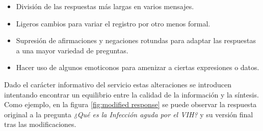 \begin{itemize}
	\item División de las respuestas más largas en varios mensajes.
	\item Ligeros cambios para variar el registro por otro menos formal.
	\item Supresión de afirmaciones y negaciones rotundas para adaptar las respuestas a una mayor variedad de preguntas.
	\item Hacer uso de algunos emoticonos para amenizar a ciertas expresiones o datos.
\end{itemize}

Dado el carácter informativo del servicio estas alteraciones se introducen intentando encontrar un equilibrio entre la calidad de la información y la síntesis. Como ejemplo, en la figura \ref{fig:modified response} se puede observar la respuesta original a la pregunta \textit{¿Qué es la Infección aguda por el VIH?} y su versión final tras las modificaciones.

